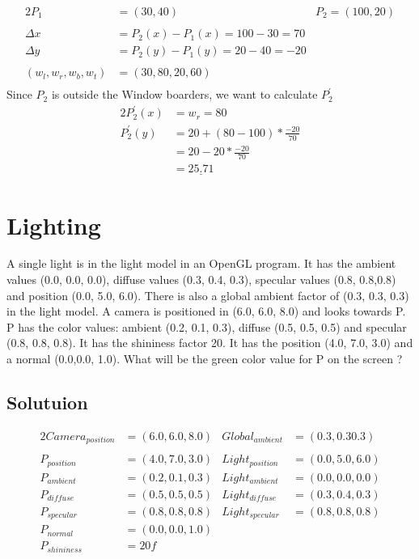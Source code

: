 \documentclass[12pt,fleqn,reqno]{article}
\begin{document}
\begin{alignat*}{2}
	P_1 		&= (30,40) &P_2 = (100,20)\\
	\\
	\Delta x 	&= P_2(x) - P_1(x) = 100 -30 = 70\\
	\Delta y	&= P_2(y) - P_1(y) = 20 -40 = -20 \\
	\\
	(w_l,w_r,w_b,w_t) &= (30,80,20,60)\\
\end{alignat*}
Since \(P_2\) is outside the Window boarders, we want to calculate \( P_{2}^{'} \)
\begin{alignat*}{2}
	 P_{2}^{'}(x) &= w_r = 80\\
	 P_{2}^{'}(y) &= 20 + (80 -100) * \frac{-20}{70}\\
	  	&= 20 - 20 *  \frac{-20}{70}\\
		&=  \underline{25.71}
\end{alignat*}

\section{Lighting}
A single light is in the light model in an OpenGL program. It has the ambient values (0.0, 0.0, 0.0), diffuse values (0.3, 0.4, 0.3), specular values (0.8, 0.8,0.8) and position (0.0, 5.0, 6.0). There is also a global ambient factor of (0.3, 0.3, 0.3) in the light model.
A camera is positioned in (6.0, 6.0, 8.0) and looks towards P.
P has the color values:
ambient (0.2, 0.1, 0.3), diffuse (0.5, 0.5, 0.5) and specular (0.8, 0.8, 0.8). It has the shininess factor 20. It has the position (4.0, 7.0, 3.0) and a normal (0.0,0.0, 1.0).
What will be the green color value for P on the screen ?

\subsection{Solutuion}
\begin{alignat*}{2}
	Camera_{position}	&= (6.0, 6.0, 8.0)
	&Global_{ambient}	&= (0.3, 0.3 0.3) \\
	\\
	P_{position}		&=  (4.0, 7.0, 3.0)
	&Light_{position}	&= (0.0, 5.0, 6.0)\\
	P_{ambient}		&= (0.2, 0.1, 0.3)
	&Light_{ambient}	&= (0.0, 0.0, 0.0)\\
	P_{diffuse}		&= (0.5, 0.5, 0.5)
	&Light_{diffuse}	&= (0.3, 0.4, 0.3)\\
	P_{specular}		&= (0.8, 0.8, 0.8)
	&Light_{specular}	&= (0.8, 0.8,0.8)\\
	P_{normal}		&=  (0.0,0.0, 1.0)\\
	P_{shininess}		&=  20f\\
\end{alignat*}
\end{document}
